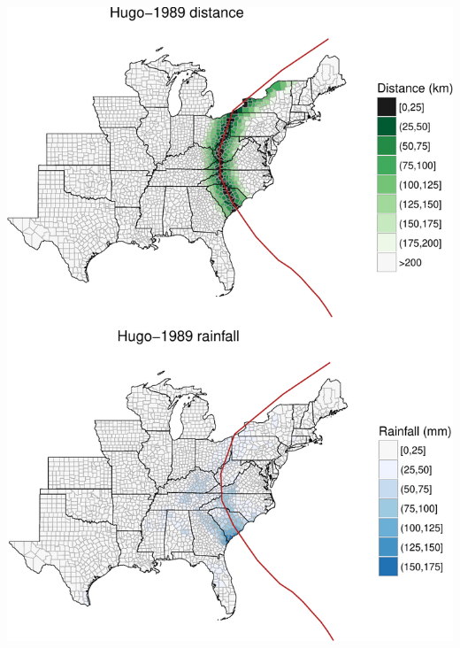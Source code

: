 \documentclass[]{elsarticle} %
\makeatletter
\def\maxwidth{\ifdim\Gin@nat@width>\linewidth\linewidth
\else\Gin@nat@width\fi}
\let\Oldincludegraphics\includegraphics
\renewcommand{\includegraphics}[1]{\Oldincludegraphics[width=\maxwidth]{#1}}
\makeatother
\begin{document}
\includegraphics{DraftExposurePaper_files/figure-latex/unnamed-chunk-7-1.pdf}
\end{document}
